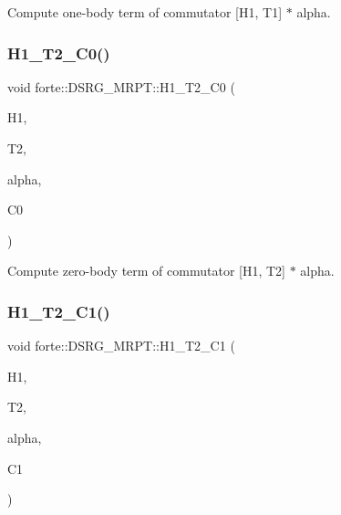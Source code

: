 Compute one-\/body term of commutator \mbox{[}H1, T1\mbox{]} $\ast$ alpha. 

\mbox{\label{classforte_1_1_d_s_r_g___m_r_p_t_aee81005e7b9859f8bceea16dd8728aa7}} 
\subsubsection{\texorpdfstring{H1\+\_\+\+T2\+\_\+\+C0()}{H1\_T2\_C0()}}
{\footnotesize\ttfamily void forte\+::\+D\+S\+R\+G\+\_\+\+M\+R\+P\+T\+::\+H1\+\_\+\+T2\+\_\+\+C0 (\begin{DoxyParamCaption}\item[{Blocked\+Tensor \&}]{H1,  }\item[{Blocked\+Tensor \&}]{T2,  }\item[{const double \&}]{alpha,  }\item[{double \&}]{C0 }\end{DoxyParamCaption})\hspace{0.3cm}{\ttfamily [protected]}}



Compute zero-\/body term of commutator \mbox{[}H1, T2\mbox{]} $\ast$ alpha. 

\mbox{\label{classforte_1_1_d_s_r_g___m_r_p_t_a6de48bc90d339cbfc5d6d6ff9d15f07d}} 
\subsubsection{\texorpdfstring{H1\+\_\+\+T2\+\_\+\+C1()}{H1\_T2\_C1()}}
{\footnotesize\ttfamily void forte\+::\+D\+S\+R\+G\+\_\+\+M\+R\+P\+T\+::\+H1\+\_\+\+T2\+\_\+\+C1 (\begin{DoxyParamCaption}\item[{Blocked\+Tensor \&}]{H1,  }\item[{Blocked\+Tensor \&}]{T2,  }\item[{const double \&}]{alpha,  }\item[{Blocked\+Tensor \&}]{C1 }\end{DoxyParamCaption})\hspace{0.3cm}{\ttfamily [protected]}}



